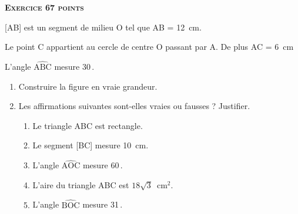 \textbf{\textsc{Exercice 6\hfill 7 points}}

\medskip

[AB] est un segment de milieu O tel que AB = 12~cm.

Le point C appartient au cercle de centre O passant par A. De plus AC = 6~cm

L'angle $\widehat{\text{ABC}}$ mesure 30\,\degres.

\medskip

\begin{enumerate}
\item Construire la figure en vraie grandeur.
\item Les affirmations suivantes sont-elles vraies ou fausses ? Justifier.
	\begin{enumerate}
		\item Le triangle ABC est rectangle.
		\item Le segment [BC] mesure 10~cm.
		\item L'angle $\widehat{\text{AOC}}$ mesure 60\,\degres.
		\item L'aire du triangle ABC est $18\sqrt{3}$~cm$^2$.
		\item L'angle $\widehat{\text{BOC}}$ mesure 31\,\degres.
	\end{enumerate}
\end{enumerate}

\vspace{0.5cm}

